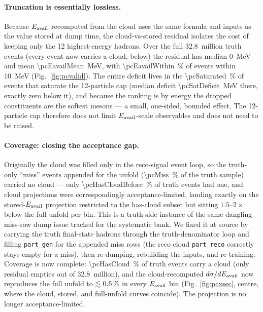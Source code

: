\paragraph{Truncation is essentially lossless.}
Because $E_{\mathrm{avail}}$ recomputed from the cloud uses the same formula and
inputs as the value stored at dump time, the cloud-vs-stored residual isolates
the cost of keeping only the 12 highest-energy hadrons. Over the full
\num{32.8}~million truth events (every event now carries a cloud, below) the
residual has median
\SI{0}{MeV} and mean \SI{\pcEavailMean}{MeV}, with \SI{\pcEavailWithin}{\percent}
of events within \SI{10}{MeV} (Fig.~\ref{fig:pcvalid}). The entire deficit
lives in the \SI{\pcSaturated}{\percent} of events that saturate the 12-particle
cap (median deficit \SI{\pcSatDeficit}{MeV} there, exactly zero below it), and
because the ranking is by energy the dropped constituents are the softest
mesons --- a small, one-sided, bounded effect. The 12-particle cap therefore
does not limit $E_{\mathrm{avail}}$-scale observables and does not need to be raised.

\paragraph{Coverage: closing the acceptance gap.}
Originally the cloud was filled only in the reco-signal event loop, so the
truth-only ``miss'' events appended for the unfold (\SI{\pcMiss}{\percent} of
the truth sample) carried no cloud --- only \SI{\pcHasCloudBefore}{\percent} of
truth events had one, and cloud projections were correspondingly
acceptance-limited, landing exactly on the stored-$E_{\mathrm{avail}}$ projection
restricted to the has-cloud subset but sitting $1.5$--$2\times$ below
the full unfold per bin. This is a truth-side instance of the same
dangling-miss-row dump issue tracked for the systematic bank. We fixed it at
source by carrying the truth final-state hadrons through the
truth-denominator loop and filling \texttt{part\_gen} for the appended miss
rows (the reco cloud \texttt{part\_reco} correctly stays empty for a miss),
then re-dumping, rebuilding the inputs, and re-training. Coverage is now
complete: \SI{\pcHasCloud}{\percent} of truth events carry a cloud (only
\pcEmptyCloud{} residual empties out of \num{32.8}~million), and the
cloud-recomputed $d\sigma/dE_{\mathrm{avail}}$ now reproduces the full unfold to
$\lesssim\SI{0.5}{\percent}$ in every $E_{\mathrm{avail}}$ bin
(Fig.~\ref{fig:pcxsec}, centre, where the cloud, stored, and full-unfold
curves coincide). The projection is no longer acceptance-limited.

